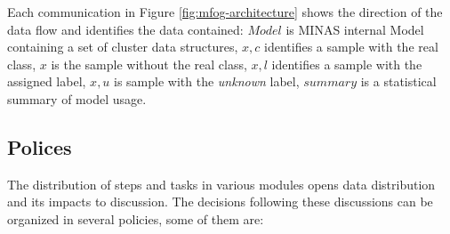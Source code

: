Each communication in Figure \ref{fig:mfog-architecture} shows the direction of the data flow
and identifies the data contained:
$Model$ is MINAS internal Model containing a set of cluster data structures,
$x,c$ identifies a sample with the real class,
$x$ is the sample without the real class,
$x,l$ identifies a sample with the assigned label,
$x,u$ is  sample with the \emph{unknown} label,
$summary$ is a statistical summary of model usage.

\subsection{Polices}\label{sec:polices}

The distribution of steps and tasks in various modules opens
data distribution and its impacts to discussion.
The decisions following these discussions can be organized in
several policies, some of them are:

